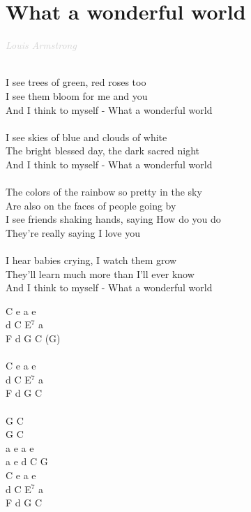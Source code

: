 \documentclass[a5paper, 10pt]{book}
\begin{document}
\section{What a wonderful world}\textcolor{lightgray}{\textit{Louis Armstrong}}\\~\\
\begin{minipage}[t]{0.8\textwidth}
I see trees of green, red roses too\\
I see them bloom for me and you\\
And I think to myself - What a wonderful world \\
\\
I see skies of blue and clouds of white\\
The bright blessed day, the dark sacred night\\
And I think to myself - What a wonderful world\\
\\
\hspace*{5mm}The colors of the rainbow so pretty in the sky\\
\hspace*{5mm}Are also on the faces of people going by\\
\hspace*{5mm}I see friends shaking hands, saying How do you do \\
\hspace*{5mm}They're really saying I love you \\
\\
I hear babies crying, I watch them grow\\
They'll learn much more than I'll ever know\\
And I think to myself - What a wonderful world\\
\end{minipage}
\begin{minipage}[t]{0.2\textwidth}
 C e a e\\
 d C E$^7$ a\\
F d G C (G)\\
\\
 C e a e\\
 d C E$^7$ a\\
 F d G C\\
 \\
 G C\\
 G C\\
a e a e\\
a e d C G\\

 C e a e\\
 d C E$^7$ a\\
 F d G C\\
\end{minipage}
\end{document}
